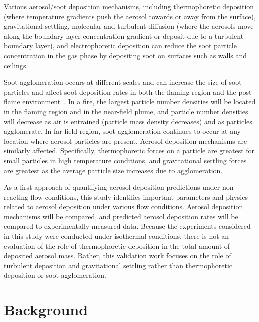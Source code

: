 Various aerosol/soot deposition mechanisms, including thermophoretic deposition (where temperature gradients push the aerosol towards or away from the surface), gravitational settling, molecular and turbulent diffusion (where the aerosols move along the boundary layer concentration gradient or deposit due to a turbulent boundary layer), and electrophoretic deposition can reduce the soot particle concentration in the gas phase by depositing soot on surfaces such as walls and ceilings.

Soot agglomeration occurs at different scales and can increase the size of soot particles and affect soot deposition rates in both the flaming region and the post-flame environment~\cite{Butler:2004p433,mulholland1977coagulation}. In a fire, the largest particle number densities will be located in the flaming region and in the near-field plume, and particle number densities will decrease as air is entrained (particle mass density decreases) and as particles agglomerate. In far-field region, soot agglomeration continues to occur at any location where aerosol particles are present. Aerosol deposition mechanisms are similarly affected. Specifically, thermophoretic forces on a particle are greatest for small particles in high temperature conditions, and gravitational settling forces are greatest as the average particle size increases due to agglomeration.

As a first approach of quantifying aerosol deposition predictions under non-reacting flow conditions, this study identifies important parameters and physics related to aerosol deposition under various flow conditions. Aerosol deposition mechanisms will be compared, and predicted aerosol deposition rates will be compared to experimentally measured data. Because the experiments considered in this study were conducted under isothermal conditions, there is not an evaluation of the role of thermophoretic deposition in the total amount of deposited aerosol mass. Rather, this validation work focuses on the role of turbulent deposition and gravitational settling rather than thermophoretic deposition or soot agglomeration.

\section{Background}
\label{sec:Background}

